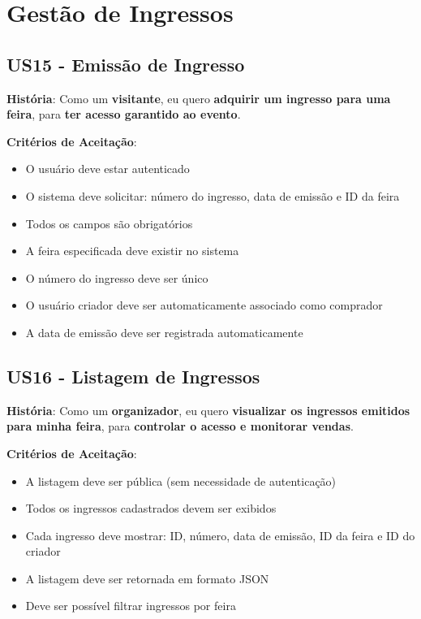 \documentclass[12pt,a4paper]{article}
\begin{document}
\section{Gestão de Ingressos}

\subsection{US15 - Emissão de Ingresso}

\textbf{História}: Como um \textbf{visitante}, eu quero \textbf{adquirir um ingresso para uma feira}, para \textbf{ter acesso garantido ao evento}.

\textbf{Critérios de Aceitação}:
\begin{itemize}
    \item O usuário deve estar autenticado
    \item O sistema deve solicitar: número do ingresso, data de emissão e ID da feira
    \item Todos os campos são obrigatórios
    \item A feira especificada deve existir no sistema
    \item O número do ingresso deve ser único
    \item O usuário criador deve ser automaticamente associado como comprador
    \item A data de emissão deve ser registrada automaticamente
\end{itemize}

\subsection{US16 - Listagem de Ingressos}

\textbf{História}: Como um \textbf{organizador}, eu quero \textbf{visualizar os ingressos emitidos para minha feira}, para \textbf{controlar o acesso e monitorar vendas}.

\textbf{Critérios de Aceitação}:
\begin{itemize}
    \item A listagem deve ser pública (sem necessidade de autenticação)
    \item Todos os ingressos cadastrados devem ser exibidos
    \item Cada ingresso deve mostrar: ID, número, data de emissão, ID da feira e ID do criador
    \item A listagem deve ser retornada em formato JSON
    \item Deve ser possível filtrar ingressos por feira
\end{itemize}
\end{document}
